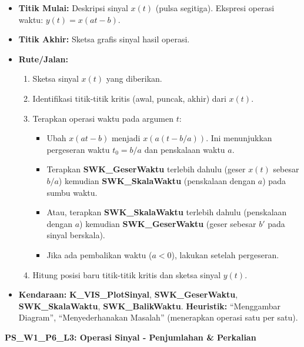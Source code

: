 \documentclass[
  letterpaper,
  DIV=11,
  numbers=noendperiod]{scrreprt}
\providecommand{\tightlist}{%
  \setlength{\itemsep}{0pt}\setlength{\parskip}{0pt}}\usepackage{longtable,booktabs,array}
\begin{document}
\begin{itemize}
\tightlist
\item
  \textbf{Titik Mulai:} Deskripsi sinyal \(x(t)\) (pulsa segitiga).
  Ekspresi operasi waktu: \(y(t) = x(at-b)\).
\item
  \textbf{Titik Akhir:} Sketsa grafis sinyal hasil operasi.
\item
  \textbf{Rute/Jalan:}

  \begin{enumerate}
  \def\labelenumi{\arabic{enumi}.}
  \tightlist
  \item
    Sketsa sinyal \(x(t)\) yang diberikan.
  \item
    Identifikasi titik-titik kritis (awal, puncak, akhir) dari \(x(t)\).
  \item
    Terapkan operasi waktu pada argumen \(t\):

    \begin{itemize}
    \tightlist
    \item
      Ubah \(x(at-b)\) menjadi \(x(a(t-b/a))\). Ini menunjukkan
      pergeseran waktu \(t_0 = b/a\) dan penskalaan waktu \(a\).
    \item
      Terapkan \textbf{SWK\_GeserWaktu} terlebih dahulu (geser \(x(t)\)
      sebesar \(b/a\)) kemudian \textbf{SWK\_SkalaWaktu} (penskalaan
      dengan \(a\)) pada sumbu waktu.
    \item
      Atau, terapkan \textbf{SWK\_SkalaWaktu} terlebih dahulu
      (penskalaan dengan \(a\)) kemudian \textbf{SWK\_GeserWaktu} (geser
      sebesar \(b'\) pada sinyal berskala).
    \item
      Jika ada pembalikan waktu (\(a<0\)), lakukan setelah pergeseran.
    \end{itemize}
  \item
    Hitung posisi baru titik-titik kritis dan sketsa sinyal \(y(t)\).
  \end{enumerate}
\item
  \textbf{Kendaraan:} \textbf{K\_VIS\_PlotSinyal},
  \textbf{SWK\_GeserWaktu}, \textbf{SWK\_SkalaWaktu},
  \textbf{SWK\_BalikWaktu}. \textbf{Heuristik:} ``Menggambar Diagram'',
  ``Menyederhanakan Masalah'' (menerapkan operasi satu per satu).
\end{itemize}

\textbf{PS\_W1\_P6\_L3: Operasi Sinyal - Penjumlahan \& Perkalian}
\end{document}
